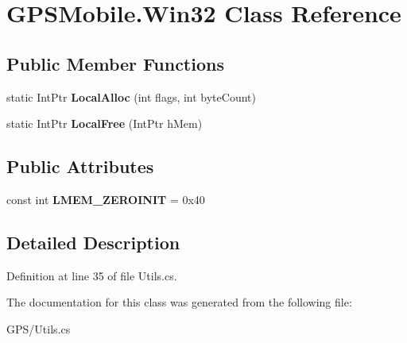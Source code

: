 \hypertarget{class_g_p_s_mobile_1_1_win32}{
\section{GPSMobile.Win32 Class Reference}
\label{class_g_p_s_mobile_1_1_win32}
}
\subsection*{Public Member Functions}
\begin{DoxyCompactItemize}
\item 
\hypertarget{class_g_p_s_mobile_1_1_win32_abd657d9fd333e33f9b272725cf40fbe7}{
static IntPtr {\bfseries LocalAlloc} (int flags, int byteCount)}
\label{class_g_p_s_mobile_1_1_win32_abd657d9fd333e33f9b272725cf40fbe7}

\item 
\hypertarget{class_g_p_s_mobile_1_1_win32_a23001bb69ffac36773b8dd2fe3a0c9e9}{
static IntPtr {\bfseries LocalFree} (IntPtr hMem)}
\label{class_g_p_s_mobile_1_1_win32_a23001bb69ffac36773b8dd2fe3a0c9e9}

\end{DoxyCompactItemize}
\subsection*{Public Attributes}
\begin{DoxyCompactItemize}
\item 
\hypertarget{class_g_p_s_mobile_1_1_win32_a8c602d56f7a0f9ba8d1534455e8a396c}{
const int {\bfseries LMEM\_\-ZEROINIT} = 0x40}
\label{class_g_p_s_mobile_1_1_win32_a8c602d56f7a0f9ba8d1534455e8a396c}

\end{DoxyCompactItemize}


\subsection{Detailed Description}


Definition at line 35 of file Utils.cs.

The documentation for this class was generated from the following file:\begin{DoxyCompactItemize}
\item 
GPS/Utils.cs\end{DoxyCompactItemize}
